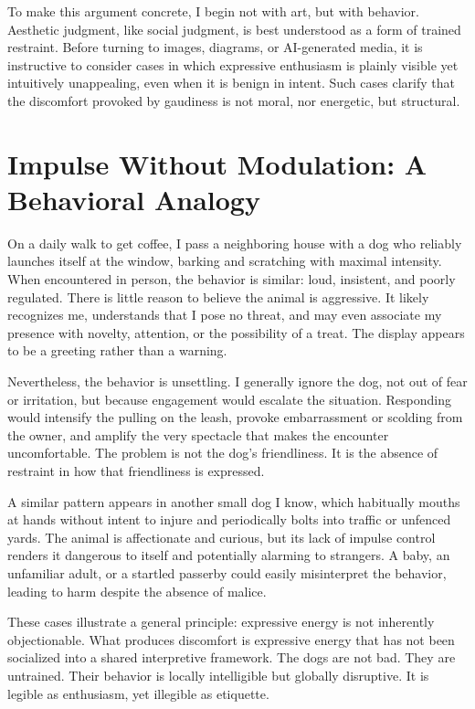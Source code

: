 \documentclass[12pt]{article}
\begin{document}
To make this argument concrete, I begin not with art, but with behavior. Aesthetic judgment, like social judgment, is best understood as a form of trained restraint. Before turning to images, diagrams, or AI-generated media, it is instructive to consider cases in which expressive enthusiasm is plainly visible yet intuitively unappealing, even when it is benign in intent. Such cases clarify that the discomfort provoked by gaudiness is not moral, nor energetic, but structural.

\section{Impulse Without Modulation: A Behavioral Analogy}

On a daily walk to get coffee, I pass a neighboring house with a dog who reliably launches itself at the window, barking and scratching with maximal intensity. When encountered in person, the behavior is similar: loud, insistent, and poorly regulated. There is little reason to believe the animal is aggressive. It likely recognizes me, understands that I pose no threat, and may even associate my presence with novelty, attention, or the possibility of a treat. The display appears to be a greeting rather than a warning.

Nevertheless, the behavior is unsettling. I generally ignore the dog, not out of fear or irritation, but because engagement would escalate the situation. Responding would intensify the pulling on the leash, provoke embarrassment or scolding from the owner, and amplify the very spectacle that makes the encounter uncomfortable. The problem is not the dog’s friendliness. It is the absence of restraint in how that friendliness is expressed.

A similar pattern appears in another small dog I know, which habitually mouths at hands without intent to injure and periodically bolts into traffic or unfenced yards. The animal is affectionate and curious, but its lack of impulse control renders it dangerous to itself and potentially alarming to strangers. A baby, an unfamiliar adult, or a startled passerby could easily misinterpret the behavior, leading to harm despite the absence of malice.

These cases illustrate a general principle: expressive energy is not inherently objectionable. What produces discomfort is expressive energy that has not been socialized into a shared interpretive framework. The dogs are not bad. They are untrained. Their behavior is locally intelligible but globally disruptive. It is legible as enthusiasm, yet illegible as etiquette.
\end{document}
